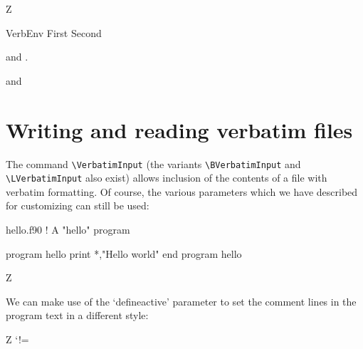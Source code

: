 \documentclass{article}
\newcommand\cs[1]{\texttt{\textbackslash#1}}
\begin{document}
\begin{SideBySideExample}
  Z
  \begin{SaveVerbatim}[gobble=5]{VerbEnv}
    First
    Second
  \end{SaveVerbatim}

  and .

   and
\end{SideBySideExample}

\section{Writing and reading verbatim files}
\label{sec:VerbatimInclude}

  The command \cs{VerbatimInput} (the variants \cs{BVerbatimInput} and
\cs{LVerbatimInput} also exist) allows inclusion of the contents of a file
with verbatim formatting. Of course, the various parameters which we have
described for customizing can still be used:


\typeout{*************************************}
\typeout{*************************************}

\begin{VerbatimOut}{hello.f90}
  ! A "hello" program

  program hello
    print *,"Hello world"
  end program hello
\end{VerbatimOut}

\begin{SideBySideExample}
  Z



\end{SideBySideExample}

  We can make use of the `defineactive' parameter to set the comment lines
  in the program text in a different style:

\begin{SideBySideExample}
  Z
  \def\ExclamationPoint{\char33}
  \catcode`!=\active
  \VerbatimInput%
    [defineactive=%
      \def!{\color{cyan}\itshape
        \ExclamationPoint}]
    {hello.f90}
\end{SideBySideExample}
\end{document}
